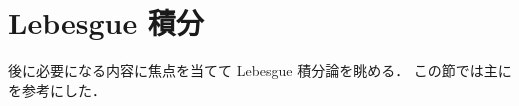 \section{Lebesgue 積分}

後に必要になる内容に焦点を当てて Lebesgue 積分論を眺める．
この節では主に \cite{Fo99,It63,mpmi} を参考にした．




